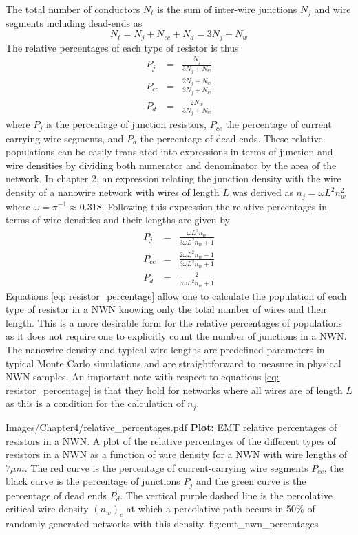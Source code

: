 The total number of conductors $N_t$ is the sum of inter-wire junctions $N_j$ and wire segments including dead-ends as
\begin{equation}
N_t = N_j + N_{cc} + N_d = 3 N_j+N_w
\end{equation}
The relative percentages of each type of resistor is thus
\begin{eqnarray}
P_j &=& \frac{N_j}{3 N_j+N_w} \nonumber \\
P_{cc} &=& \frac{2 N_j - N_w}{3 N_j+N_w} \nonumber \\
P_d &=& \frac{2 N_w}{3 N_j+N_w}
\end{eqnarray}
where $P_j$ is the percentage of junction resistors, $P_{cc}$ the percentage of current carrying wire segments, and $P_d$ the percentage of dead-ends. These relative populations can be easily translated into expressions in terms of junction and wire densities by dividing both numerator and denominator by the area of the network. In chapter 2, an expression relating the junction density with the wire density of a nanowire network with wires of length $L$ was derived as\cite{kallmes1960,sampson2008,ocallaco2016} $n_j = \omega L^2 n_w^2$ where $\omega = \pi^{-1} \approx 0.318$. Following this expression the relative percentages in terms of wire densities and their lengths are given by
\begin{eqnarray}
P_j &=& \frac{ \omega L^2 n_w}{3 \omega L^2 n_w + 1} \nonumber \\
P_{cc} &=& \frac{2 \omega L^2 n_w - 1}{3 \omega L^2 n_w + 1} \nonumber \\
P_d &=& \frac{2 }{3 \omega L^2 n_w + 1}
\label{eq: resistor_percentage}
\end{eqnarray}
Equations \ref{eq: resistor_percentage} allow one to calculate the population of each type of resistor in a NWN knowing only the total number of wires and their length. This is a more desirable form for the relative percentages of populations as it does not require one to explicitly count the number of junctions in a NWN. The nanowire density and typical wire lengths are predefined parameters in typical Monte Carlo simulations and are straightforward to measure in physical NWN samples. An important note with respect to equations \ref{eq: resistor_percentage} is that they hold for networks where all wires are of length $L$ as this is a condition for the calculation of $n_j$. 

{Images/Chapter4/relative_percentages.pdf}
{\textbf{Plot:} EMT relative percentages of resistors in a NWN.}
{A plot of the relative percentages of the different types of resistors in a NWN as a function of wire density for a NWN with wire lengths of $7\mu m$. The red curve is the percentage of current-carrying wire segments $P_{cc}$, the black curve is the percentage of junctions $P_j$ and the green curve is the percentage of dead ends $P_d$. The vertical purple dashed line is the percolative critical wire density $(n_w)_c$ at which a percolative path occurs in 50\% of randomly generated networks with this density\cite{li2009}.}
{fig:emt_nwn_percentages}

